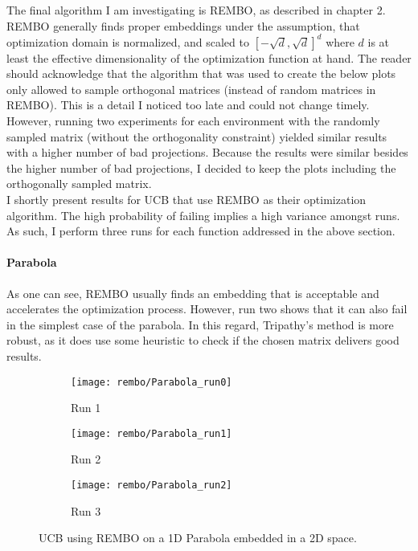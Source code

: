 The final algorithm I am investigating is REMBO, as described in chapter 2.
REMBO generally finds proper embeddings under the assumption, that optimization domain is normalized, and scaled to $[-\sqrt{d}, \sqrt{d}]^d$ where $d$ is at least the effective dimensionality of the optimization function at hand. 
The reader should acknowledge that the algorithm that was used to create the below plots only allowed to sample orthogonal matrices (instead of random matrices in REMBO).
This is a detail I noticed too late and could not change timely.
However, running two experiments for each environment with the randomly sampled matrix (without the orthogonality constraint) yielded similar results with a higher number of bad projections.
Because the results were similar besides the higher number of bad projections, I decided to keep the plots including the orthogonally sampled matrix. \\

I shortly present results for UCB that use REMBO as their optimization algorithm.
The high probability of failing implies a high variance amongst runs. 
As such, I perform three runs for each function addressed in the above section.

\paragraph{Parabola}
As one can see, REMBO usually finds an embedding that is acceptable and accelerates the optimization process.
However, run two shows that it can also fail in the simplest case of the parabola.
In this regard, Tripathy's method is more robust, as it does use some heuristic to check if the chosen matrix delivers good results.


\begin{figure}[H]
\center
    \begin{subfigure}[b]{0.30\textwidth}
        \texttt{[image: rembo/Parabola\_run0]}
        \label{fig:gull}
         \caption{Run 1}
    \end{subfigure}
        \begin{subfigure}[b]{0.30\textwidth}
        \texttt{[image: rembo/Parabola\_run1]}
        \label{fig:gull}
        \caption{Run 2}
    \end{subfigure}
    \begin{subfigure}[b]{0.30\textwidth}
        \texttt{[image: rembo/Parabola\_run2]}
        \label{fig:gull}
               \caption{Run 3}
    \end{subfigure}
        \caption{UCB using REMBO on a 1D Parabola embedded in a 2D space.
    }\label{fig:animals}
\end{figure}

